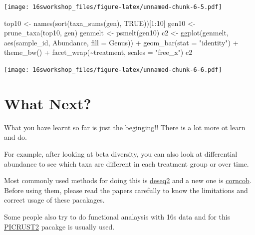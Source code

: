 \documentclass[
]{book}
\newenvironment{Shaded}{\begin{snugshade}}{\end{snugshade}}
\newcommand{\AttributeTok}[1]{\textcolor[rgb]{0.77,0.63,0.00}{#1}}
\newcommand{\ConstantTok}[1]{\textcolor[rgb]{0.00,0.00,0.00}{#1}}
\newcommand{\DecValTok}[1]{\textcolor[rgb]{0.00,0.00,0.81}{#1}}
\newcommand{\FunctionTok}[1]{\textcolor[rgb]{0.00,0.00,0.00}{#1}}
\newcommand{\NormalTok}[1]{#1}
\newcommand{\OtherTok}[1]{\textcolor[rgb]{0.56,0.35,0.01}{#1}}
\newcommand{\SpecialCharTok}[1]{\textcolor[rgb]{0.00,0.00,0.00}{#1}}
\newcommand{\StringTok}[1]{\textcolor[rgb]{0.31,0.60,0.02}{#1}}
\begin{document}
\texttt{[image: 16sworkshop\_files/figure-latex/unnamed-chunk-6-5.pdf]}

\begin{Shaded}
\begin{Highlighting}[]
\NormalTok{top10 }\OtherTok{\textless{}{-}} \FunctionTok{names}\NormalTok{(}\FunctionTok{sort}\NormalTok{(}\FunctionTok{taxa\_sums}\NormalTok{(gen), }\ConstantTok{TRUE}\NormalTok{))[}\DecValTok{1}\SpecialCharTok{:}\DecValTok{10}\NormalTok{]}
\NormalTok{gen10 }\OtherTok{\textless{}{-}} \FunctionTok{prune\_taxa}\NormalTok{(top10, gen)}
\NormalTok{genmelt }\OtherTok{\textless{}{-}} \FunctionTok{psmelt}\NormalTok{(gen10)}
\NormalTok{c2 }\OtherTok{\textless{}{-}} \FunctionTok{ggplot}\NormalTok{(genmelt, }\FunctionTok{aes}\NormalTok{(sample\_id, Abundance, }\AttributeTok{fill =}\NormalTok{ Genus)) }\SpecialCharTok{+}
  \FunctionTok{geom\_bar}\NormalTok{(}\AttributeTok{stat =} \StringTok{"identity"}\NormalTok{) }\SpecialCharTok{+}
  \FunctionTok{theme\_bw}\NormalTok{() }\SpecialCharTok{+}
  \FunctionTok{facet\_wrap}\NormalTok{(}\SpecialCharTok{\textasciitilde{}}\NormalTok{treatment, }\AttributeTok{scales =} \StringTok{"free\_x"}\NormalTok{)}
\NormalTok{c2}
\end{Highlighting}
\end{Shaded}

\texttt{[image: 16sworkshop\_files/figure-latex/unnamed-chunk-6-6.pdf]}

\hypertarget{what-next}{%
\chapter{What Next?}\label{what-next}}

What you have learnt so far is just the beginging!! There is a lot more ot learn and do.

For example, after looking at beta diversity, you can also look at differential abundance to see which taxa are different in each treatment group or over time.

Most commonly used methods for doing this is \href{https://bioconductor.org/packages/release/bioc/html/DESeq2.html}{deseq2} and a new one is \href{https://github.com/bryandmartin/corncob/}{corncob}. Before using them, please read the papers carefully to know the limitations and correct usage of these pacakages.

Some people also try to do functional analaysis with 16s data and for this \href{https://github.com/picrust/picrust2/wiki}{PICRUST2} pacakge is usually used.

  
\end{document}
